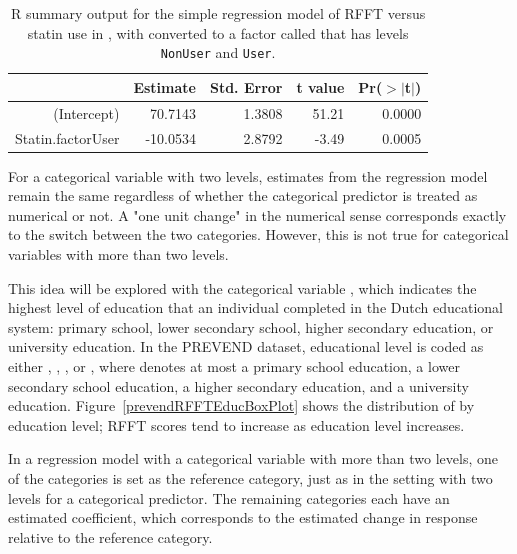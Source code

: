 \begin{table}[ht]
	\centering
	\begin{tabular}{rrrrr}
		\hline
		& Estimate & Std. Error & t value & Pr($>$$|$t$|$) \\ 
		\hline
		(Intercept) & 70.7143 & 1.3808 & 51.21 & 0.0000 \\ 
		 Statin.factorUser & -10.0534 & 2.8792 & -3.49 & 0.0005 \\ 
		\hline
	\end{tabular}
	\caption{\textsf{R} summary output for the simple regression model of RFFT versus statin use in , with  converted to a factor called  that has levels \texttt{NonUser} and \texttt{User}.} 
	\label{prevendRFFTStatinFactorRegression}
\end{table}

For a categorical variable with two levels, estimates from the regression model remain the same regardless of whether the categorical predictor is treated as numerical or not. A "one unit change" in the numerical sense corresponds exactly to the switch between the two categories. However, this is not true for categorical variables with more than two levels. 

This idea will be explored with the categorical variable , which indicates the highest level of education that an individual completed in the Dutch educational system: primary school, lower secondary school, higher secondary education, or university education. In the PREVEND dataset, educational level is coded as either , , , or , where  denotes at most a primary school education,  a lower secondary school education,  a higher secondary education, and  a university education. Figure~\ref{prevendRFFTEducBoxPlot} shows the distribution of  by education level; RFFT scores tend to increase as education level increases. 

In a regression model with a categorical variable with more than two levels, one of the categories is set as the reference category, just as in the setting with two levels for a categorical predictor. The remaining categories each have an estimated coefficient, which corresponds to the estimated change in response relative to the reference category. 

